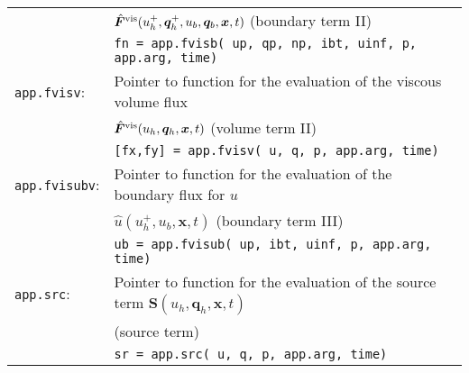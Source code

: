 \documentclass[11pt]{article}
\begin{document}
\begin{itemize}
\begin{tabular}{|ll}
	                               & $\hat{\bm{F}}^{\rm vis}(u_h^+,\bm{q}_h^+, u_b, \bm{q}_b, \bm{x},t)$ (boundary  term II) \\                   
	                            & \texttt{fn = app.fvisb( up, qp, np, ibt, uinf, p, app.arg, time)}
	                            \\
	    \texttt{app.fvisv}: &  Pointer to function for the evaluation of the viscous volume flux  \\   
	                               & $\hat{\bm{F}}^{\rm vis}(u_h,\bm{q}_h,\bm{x},t)$ (volume term II) \\  
	                                & \texttt{[fx,fy] = app.fvisv( u, q, p, app.arg, time)} 
	                               \\
	     \texttt{app.fvisubv}: &  Pointer to function for the evaluation of the boundary flux for $u$  \\   
	                               & $\hat{u}(u_h^+,u_b,\bm{x},t)$ (boundary term III) \\  
	                                & \texttt{ub = app.fvisub( up, ibt, uinf, p, app.arg, time)} 
	                               \\
	    \texttt{app.src}: &  Pointer to function for the evaluation of the source term ${\bm{S}}(u_h,\bm{q}_h,\bm{x},t)$ \\   
	                               & (source term) \\  
	                                & \texttt{sr = app.src( u, q, p, app.arg, time)}        
	\end{tabular}

\end{itemize}
\end{document}
